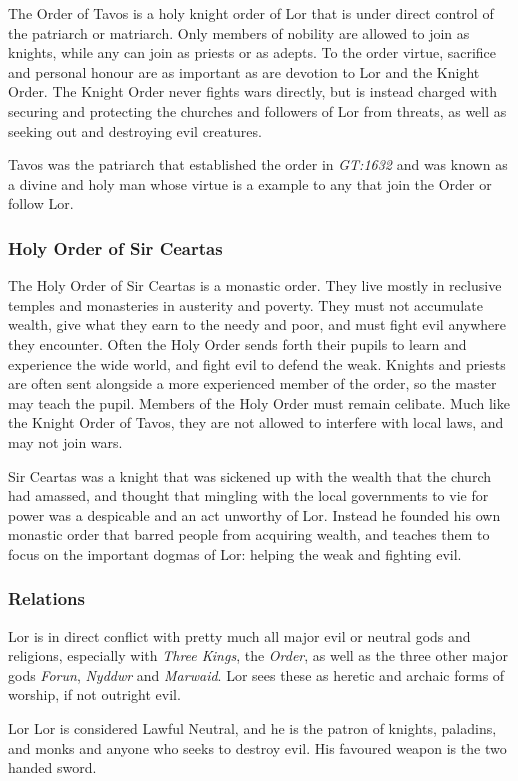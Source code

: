 The Order of Tavos is a holy knight order of Lor that is under direct control
of the patriarch or matriarch. Only members of nobility are allowed to join as
knights, while any can join as priests or as adepts. To the order virtue,
sacrifice and personal honour are as important as are devotion to Lor and the
Knight Order. The Knight Order never fights wars directly, but is instead
charged with securing and protecting the churches and followers of Lor from
threats, as well as seeking out and destroying evil creatures.

Tavos was the patriarch that established the order in \emph{GT:1632} and was
known as a divine and holy man whose virtue is a example to any that join
the Order or follow Lor.

\subsubsection{Holy Order of Sir Ceartas}
\label{sec:Holy Order of Sir Ceartas}

The Holy Order of Sir Ceartas is a monastic order. They live mostly in
reclusive temples and monasteries in austerity and poverty. They must not
accumulate wealth, give what they earn to the needy and poor, and must fight
evil anywhere they encounter. Often the Holy Order sends forth their pupils to
learn and experience the wide world, and fight evil to defend the
weak. Knights and priests are often sent alongside a more experienced member
of the order, so the master may teach the pupil. Members of the Holy Order
must remain celibate. Much like the Knight Order of Tavos, they are not
allowed to interfere with local laws, and may not join wars.

Sir Ceartas was a knight that was sickened up with the wealth that the church
had amassed, and thought that mingling with the local governments to vie for
power was a despicable and an act unworthy of Lor. Instead he founded his own
monastic order that barred people from acquiring wealth, and teaches them to
focus on the important dogmas of Lor: helping the weak and fighting evil.

\subsubsection{Relations}

Lor is in direct conflict with pretty much all major evil or neutral gods and
religions, especially with \emph{Three Kings}, the \emph{Order}, as well as
the three other major gods \emph{Forun}, \emph{Nyddwr} and \emph{Marwaid}. Lor
sees these as heretic and archaic forms of worship, if not outright evil.

\begin{35e}{Lor}
  Lor is considered Lawful Neutral, and he is the patron of knights, paladins,
  and monks and anyone who seeks to destroy evil. His favoured weapon is the
  two handed sword.
\end{35e}
